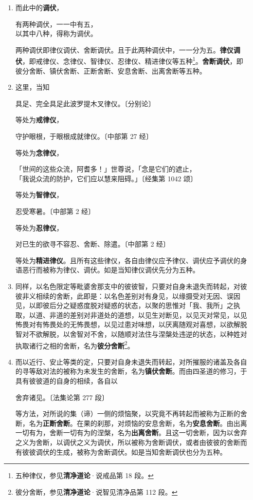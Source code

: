 \begin{enumerate}
\item 而此中的\textbf{调伏}，\begin{quoting}有两种调伏，一一中有五，\\以其中八种，得称为调伏。\end{quoting}两种调伏即律仪调伏、舍断调伏。且于此两种调伏中，一一分为五。\textbf{律仪调伏}，即戒律仪、念律仪、智律仪、忍律仪、精进律仪等五种\footnote{五种律仪，参见\textbf{清净道论}·说戒品第 18 段。}。\textbf{舍断调伏}，即彼分舍断、镇伏舍断、正断舍断、安息舍断、出离舍断等五种。
\item 这里，当知\begin{quoting}具足、完全具足此波罗提木叉律仪。{\bluefootnotesize 〔分别论〕}\end{quoting}等处为\textbf{戒律仪}，\begin{quoting}守护眼根，于眼根成就律仪。{\bluefootnotesize 〔中部第 27 经〕}\end{quoting}等处为\textbf{念律仪}，\begin{quoting}「世间的这些众流，阿耆多！」世尊说，「念是它们的遮止，\\「我说众流的防护，它们应以慧来阻碍。」{\bluefootnotesize 〔经集第 1042 颂〕}\end{quoting}等处为\textbf{智律仪}，\begin{quoting}忍受寒暑。{\bluefootnotesize 〔中部第 2 经〕}\end{quoting}等处为\textbf{忍律仪}，\begin{quoting}对已生的欲寻不容忍、舍断、除遣。{\bluefootnotesize 〔中部第 2 经〕}\end{quoting}等处为\textbf{精进律仪}。且所有这些律仪，各自由律仪应予律仪、调伏应予调伏的身语恶行而被称为律仪、调伏。如是当知律仪调伏先分为五种。
\item 同样，以名色限定等毗婆舍那支中的彼彼智，只要对自身未退失而转起，对彼彼非义相续的舍断，此即是：以名色差别对有身见，以缘摄受对无因、误因见，以即彼后分之疑惑度脱对疑惑的状态，以聚的思惟对「我、我所」之执取，以道、非道的差别对非道处的道想，以见生对断见，以见灭对常见，以见怖畏对有怖畏处的无怖畏想，以见过患对味想，以厌离随观对喜想，以欲解脱智对不欲解脱，以舍智对不舍，以随顺对法住与涅槃处违逆的状态，以种姓对执取诸行之相的舍断，名为\textbf{彼分舍断}\footnote{彼分舍断，参见\textbf{清净道论}·说智见清净品第 112 段。}。
\item 而以近行、安止等类的定，只要对自身未退失而转起，对所摧服的诸盖及各自的寻等敌对法的被称为未发生的舍断，名为\textbf{镇伏舍断}。而由四圣道的修习，于具有彼彼道的自身的相续，各自以\begin{quoting}舍弃诸见。{\bluefootnotesize 〔法集论第 277 段〕}\end{quoting}等方法，对所说的集（谛）一侧的烦恼聚，以究竟不再转起而被称为正断的舍断，名为\textbf{正断舍断}。在果的刹那，对烦恼的安息舍断，名为\textbf{安息舍断}。由出离一切有为，舍断一切有为的涅槃，名为\textbf{出离舍断}。且这一切舍断，因为以舍弃之义为舍断，以调伏之义为调伏，所以被称为舍断调伏，或者由彼彼的舍断而有彼彼调伏的生成，被称为舍断调伏。如是当知舍断调伏也分为五种。

\end{enumerate}
